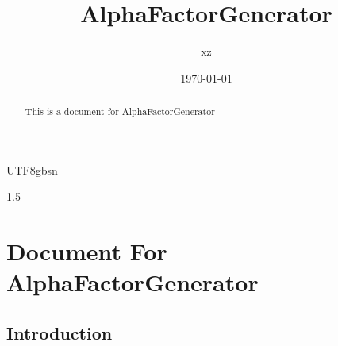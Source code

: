 \documentclass{article}
\begin{document}
\begin{CJK}{UTF8}{gbsn}
\begin{spacing}{1.5}
\title{AlphaFactorGenerator}  %
\author{xz}  %
\date{\today}    %
\maketitle     %
\begin{abstract}         %
\small \centering This is a document for AlphaFactorGenerator
\end{abstract}
  \setcounter{tocdepth}{2}
\tableofcontents  %


%
%


\section{Document For AlphaFactorGenerator}

\subsection{Introduction}



\end{spacing}
\end{CJK}
\end{document}
